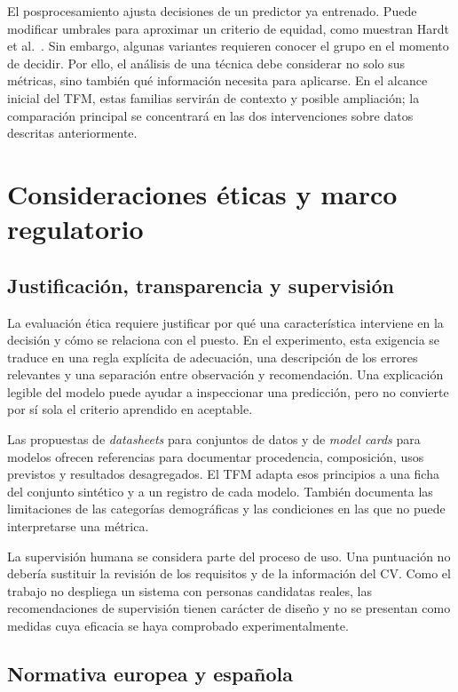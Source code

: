 \documentclass[11pt,a4paper,oneside]{report}
\begin{document}
El posprocesamiento ajusta decisiones de un predictor ya entrenado. Puede modificar umbrales para aproximar un criterio de equidad, como muestran Hardt et al.\ \cite{hardt2016}. Sin embargo, algunas variantes requieren conocer el grupo en el momento de decidir. Por ello, el análisis de una técnica debe considerar no solo sus métricas, sino también qué información necesita para aplicarse. En el alcance inicial del TFM, estas familias servirán de contexto y posible ampliación; la comparación principal se concentrará en las dos intervenciones sobre datos descritas anteriormente.

\section{Consideraciones éticas y marco regulatorio}

\subsection{Justificación, transparencia y supervisión}

La evaluación ética requiere justificar por qué una característica interviene en la decisión y cómo se relaciona con el puesto. En el experimento, esta exigencia se traduce en una regla explícita de adecuación, una descripción de los errores relevantes y una separación entre observación y recomendación. Una explicación legible del modelo puede ayudar a inspeccionar una predicción, pero no convierte por sí sola el criterio aprendido en aceptable.

Las propuestas de \textit{datasheets} para conjuntos de datos \cite{gebru2021} y de \textit{model cards} para modelos \cite{mitchell2019} ofrecen referencias para documentar procedencia, composición, usos previstos y resultados desagregados. El TFM adapta esos principios a una ficha del conjunto sintético y a un registro de cada modelo. También documenta las limitaciones de las categorías demográficas y las condiciones en las que no puede interpretarse una métrica.

La supervisión humana se considera parte del proceso de uso. Una puntuación no debería sustituir la revisión de los requisitos y de la información del CV. Como el trabajo no despliega un sistema con personas candidatas reales, las recomendaciones de supervisión tienen carácter de diseño y no se presentan como medidas cuya eficacia se haya comprobado experimentalmente.

\subsection{Normativa europea y española}
\end{document}

